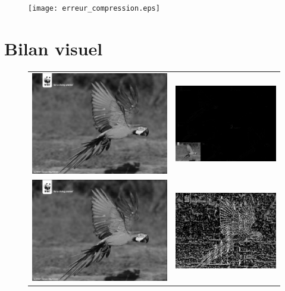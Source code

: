 \documentclass[10pt]{beamer}
\begin{document}
      \begin{frame}
	\begin{figure}[!h]
	    \centering
	    \texttt{[image: erreur\_compression.eps]}
	\end{figure}	
      \end{frame}

      
  \section{Bilan visuel}
      
    \begin{frame}      
      \begin{figure}[H]
	\centering
	\begin{tabular}{cc}
	  \includegraphics[width = 0.45 \linewidth]{ara_orig.eps} &
	  \includegraphics[width = 0.45 \linewidth]{ara_wt_V1.eps} \\
	  
	  \includegraphics[width = 0.45 \linewidth]{decomp_ara.eps} &
	  \includegraphics[width = 0.45 \linewidth]{error_ara.eps} \\	
	\end{tabular}
      \end{figure}    
    \end{frame}
    
\end{document}
